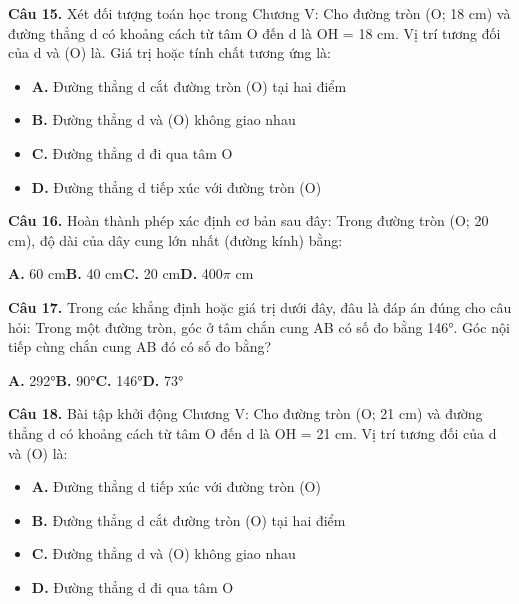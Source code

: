 \documentclass[11pt,a4paper]{article}
\begin{document}
\textbf{\color{primary} Câu 15.} Xét đối tượng toán học trong Chương V: Cho đường tròn (O; 18 cm) và đường thẳng d có khoảng cách từ tâm O đến d là OH = 18 cm. Vị trí tương đối của d và (O) là. Giá trị hoặc tính chất tương ứng là:\par
\begin{itemize}\setlength{\itemsep}{1pt}\setlength{\parskip}{0pt}
  \item[] \textbf{A.} Đường thẳng d cắt đường tròn (O) tại hai điểm
  \item[] \textbf{B.} Đường thẳng d và (O) không giao nhau
  \item[] \textbf{C.} Đường thẳng d đi qua tâm O
  \item[] \textbf{D.} Đường thẳng d tiếp xúc với đường tròn (O)
\end{itemize}\vspace{2pt}
\textbf{\color{primary} Câu 16.} Hoàn thành phép xác định cơ bản sau đây: Trong đường tròn (O; 20 cm), độ dài của dây cung lớn nhất (đường kính) bằng:\par
\hspace*{1.5em}\textbf{A.} 60 cm\quad\quad \textbf{B.} 40 cm\quad\quad \textbf{C.} 20 cm\quad\quad \textbf{D.} 400$\pi$ cm\par\vspace{2pt}
\textbf{\color{primary} Câu 17.} Trong các khẳng định hoặc giá trị dưới đây, đâu là đáp án đúng cho câu hỏi: Trong một đường tròn, góc ở tâm chắn cung AB có số đo bằng 146°. Góc nội tiếp cùng chắn cung AB đó có số đo bằng?\par
\hspace*{1.5em}\textbf{A.} 292°\quad\quad \textbf{B.} 90°\quad\quad \textbf{C.} 146°\quad\quad \textbf{D.} 73°\par\vspace{2pt}
\textbf{\color{primary} Câu 18.} Bài tập khởi động Chương V: Cho đường tròn (O; 21 cm) và đường thẳng d có khoảng cách từ tâm O đến d là OH = 21 cm. Vị trí tương đối của d và (O) là:\par
\begin{itemize}\setlength{\itemsep}{1pt}\setlength{\parskip}{0pt}
  \item[] \textbf{A.} Đường thẳng d tiếp xúc với đường tròn (O)
  \item[] \textbf{B.} Đường thẳng d cắt đường tròn (O) tại hai điểm
  \item[] \textbf{C.} Đường thẳng d và (O) không giao nhau
  \item[] \textbf{D.} Đường thẳng d đi qua tâm O
\end{itemize}\vspace{2pt}
\end{document}

